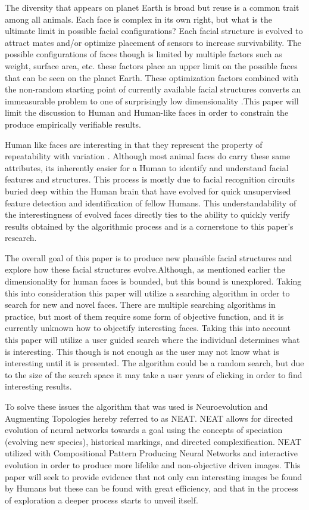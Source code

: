 The diversity that appears on planet Earth is broad but reuse is a common trait among all animals. Each face is 
complex in its own right, but what is the ultimate limit in possible facial configurations? Each facial structure
is evolved to attract mates and/or optimize placement of sensors to increase survivability. The possible configurations
of faces though is limited by multiple factors such as weight, surface area, etc. these factors place an upper limit
on the possible faces that can be seen on the planet Earth. These optimization factors combined with the non-random 
starting point of currently available facial structures converts an immeasurable problem to one of surprisingly low
dimensionality \cite{sirovich1987low}.This paper will limit the discussion to Human and Human-like faces in order to constrain the
produce empirically verifiable results.

Human like faces are interesting in that they represent the property of repeatability with variation \cite{stanley2007compositional}.
Although most animal faces do carry these same attributes, its inherently easier for a Human to identify and understand facial 
features and structures. This process is mostly due to facial recognition circuits buried deep within the Human brain that have evolved
for quick unsupervised feature detection and identification of fellow Humans. This understandability of the interestingness of evolved 
faces directly ties to the ability to quickly verify results obtained by the algorithmic process and is a cornerstone to this paper's research.

The overall goal of this paper is to produce new plausible facial structures and explore how these facial structures evolve.Although,
as mentioned earlier the dimensionality for human faces is bounded, but this bound is unexplored. Taking this into consideration
this paper will utilize a searching algorithm in order to search for new and novel faces. There are multiple searching algorithms
in practice, but most of them require some form of objective function, and it is currently unknown how to objectify interesting faces.
Taking this into account this paper will utilize a user guided search where the individual determines what is interesting. This though
is not enough as the user may not know what is interesting until it is presented. The algorithm could be a random search, but due to the
size of the search space it may take a user years of clicking in order to find interesting results. 

To solve these issues the algorithm that was used is Neuroevolution and Augmenting Topologies \cite{stanley2002evolving} hereby referred to as NEAT.
NEAT allows for directed evolution of neural networks towards a goal using the concepts of speciation (evolving new species), historical markings,
and directed complexification. NEAT utilized with Compositional Pattern Producing Neural Networks \cite{stanley2007compositional} and interactive evolution
in order to produce more lifelike and non-objective driven images. This paper will seek to provide evidence that not only can interesting images be found
by Humans but these can be found with great efficiency, and that in the process of exploration a deeper process starts to unveil itself. 

